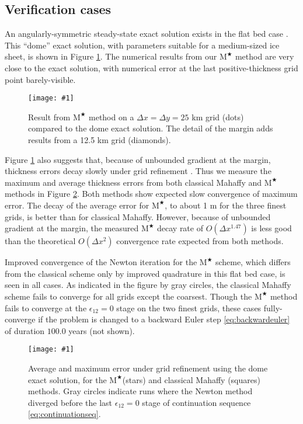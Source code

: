 \documentclass[review,letterpaper]{igs}
\newcommand{\onecol}[1]{\texttt{[image: \#1]}}
\newcommand\eps{\epsilon}
\newcommand{\Mstar}{$\text{M}^{\bigstar}$\xspace}
\begin{document}
\subsection{Verification cases}

An angularly-symmetric steady-state exact solution exists in the flat bed case \citep{Bueler2003,vanderVeen2013}.  This ``dome'' exact solution, with parameters suitable for a medium-sized ice sheet, is shown in Figure \ref{fig:domeprofile}.  The numerical results from our \Mstar method are very close to the exact solution, with numerical error at the last positive-thickness grid point barely-visible.

\begin{figure}[ht]
\onecol{domeprofile.pdf}
\caption{Result from \Mstar method on a $\Delta x=\Delta y=25$ km grid (dots) compared to the dome exact solution.  The detail of the margin adds results from a 12.5 km grid  (diamonds).}
\label{fig:domeprofile}
\end{figure}

Figure \ref{fig:domeprofile} also suggests that, because of unbounded gradient at the margin, thickness errors decay slowly under grid refinement \citep{Bueleretal2005}.  Thus we measure the maximum and average thickness errors from both classical Mahaffy and \Mstar methods in Figure \ref{fig:domeverif}.  Both methods show expected slow convergence of maximum error.  The decay of the average error for \Mstar, to about 1 m for the three finest grids, is better than for classical Mahaffy.  However, because of unbounded gradient at the margin, the measured \Mstar decay rate of $O(\Delta x^{1.47})$ is less good than the theoretical $O(\Delta x^2)$ convergence rate expected from both methods.

Improved convergence of the Newton iteration for the \Mstar scheme, which differs from the classical scheme only by improved quadrature in this flat bed case, is seen in all cases.  As indicated in the figure by gray circles, the classical Mahaffy scheme fails to converge for all grids except the coarsest.  Though the \Mstar method fails to converge at the $\eps_{12}=0$ stage on the two finest grids, these cases fully-converge if the problem is changed to a backward Euler step \eqref{eq:backwardeuler} of duration $100.0$ years (not shown).

\begin{figure}[ht]
\onecol{domeverif.pdf}
\caption{Average and maximum error under grid refinement using the dome exact solution, for the \Mstar (stars) and classical Mahaffy (squares) methods.  Gray circles indicate runs where the Newton method diverged before the last $\eps_{12}=0$ stage of continuation sequence \eqref{eq:continuationseq}.}
\label{fig:domeverif}
\end{figure}
\end{document}
